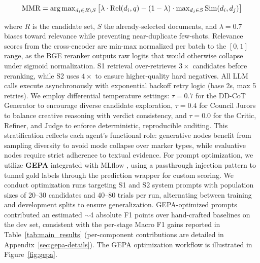 \documentclass[11pt]{article}
\begin{document}
\begin{equation}
	\resizebox{0.9\linewidth}{!}{$
			\text{MMR} =
			\arg\max_{d_i \in R \setminus S}\big[\lambda \cdot \text{Rel}(d_i, q) -
				(1-\lambda) \cdot \max_{d_j \in S}\text{Sim}(d_i, d_j)\big]
		$}
\end{equation}

where $R$ is the candidate set, $S$ the already-selected documents, and
$\lambda=0.7$ biases toward relevance while preventing near-duplicate
few-shots. Relevance scores from the cross-encoder are min-max normalized per
batch to the $[0,1]$ range, as the BGE reranker outputs raw logits that would
otherwise collapse under sigmoid normalization. S1 retrieval over-retrieves
$3\times$ candidates before reranking, while S2 uses $4\times$ to ensure
higher-quality hard negatives. All LLM calls execute asynchronously with
exponential backoff retry logic (base 2s, max 5 retries). We employ
differential temperature settings: $\tau=0.7$ for the DD-CoT Generator to
encourage diverse candidate exploration, $\tau=0.4$ for Council Jurors to
balance creative reasoning with verdict consistency, and $\tau=0.0$ for the
Critic, Refiner, and Judge to enforce deterministic, reproducible auditing.
This stratification reflects each agent's functional role: generative nodes
benefit from sampling diversity to avoid mode collapse over marker types, while
evaluative nodes require strict adherence to textual evidence. For prompt
optimization, we utilize \textbf{GEPA} \cite{agrawal2025gepa} integrated with
MLflow \cite{mlflow2024}, using a passthrough injection pattern to tunnel gold
labels through the prediction wrapper for custom scoring. We conduct
optimization runs targeting S1 and S2 system prompts with population sizes of
20--30 candidates and 40--80 trials per run, alternating between training and
development splits to ensure generalization. GEPA-optimized prompts contributed an estimated $\sim$4 absolute F1 points over hand-crafted baselines on the dev set, consistent with the per-stage Macro F1 gains reported in Table~\ref{tab:main_results} (per-component contributions are detailed in Appendix~\ref{sec:gepa-details}). The GEPA optimization
workflow is illustrated in Figure~\ref{fig:gepa}.
\end{document}
